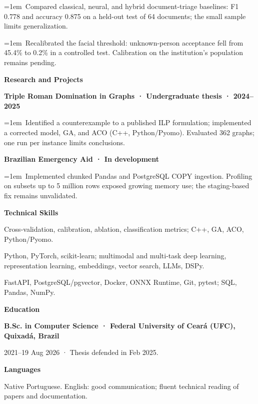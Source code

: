 \documentclass[a4paper,10pt]{article}
\begin{document}
\hangindent=1em\textbullet\ Compared classical, neural, and hybrid document-triage baselines: F1 0.778 and accuracy 0.875 on a held-out test of 64 documents; the small sample limits generalization.\par
\hangindent=1em\textbullet\ Recalibrated the facial threshold: unknown-person acceptance fell from 45.4\% to 0.2\% in a controlled test. Calibration on the institution’s population remains pending.\par
\vspace{5pt}\textbf{Research and Projects}\par
\textbf{Triple Roman Domination in Graphs · Undergraduate thesis · 2024–2025}\par
\hangindent=1em\textbullet\ Identified a counterexample to a published ILP formulation; implemented a corrected model, GA, and ACO (C++, Python/Pyomo). Evaluated 362 graphs; one run per instance limits conclusions.\par
\textbf{Brazilian Emergency Aid · In development}\par
\hangindent=1em\textbullet\ Implemented chunked Pandas and PostgreSQL COPY ingestion. Profiling on subsets up to 5 million rows exposed growing memory use; the staging-based fix remains unvalidated.\par
\vspace{5pt}\textbf{Technical Skills}\par
Cross-validation, calibration, ablation, classification metrics; C++, GA, ACO, Python/Pyomo.\par
Python, PyTorch, scikit-learn; multimodal and multi-task deep learning, representation learning, embeddings, vector search, LLMs, DSPy.\par
FastAPI, PostgreSQL/pgvector, Docker, ONNX Runtime, Git, pytest; SQL, Pandas, NumPy.\par
\vspace{5pt}\textbf{Education}\par
\textbf{B.Sc. in Computer Science · Federal University of Ceará (UFC), Quixadá, Brazil}\par
2021–19 Aug 2026 · Thesis defended in Feb 2025.\par
\vspace{5pt}\textbf{Languages}\par
Native Portuguese. English: good communication; fluent technical reading of papers and documentation.\par
\end{document}
